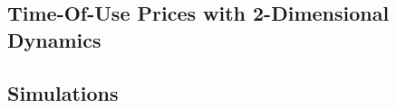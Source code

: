 \subsection{Time-Of-Use Prices with 2-Dimensional Dynamics}
\label{Subsection:Time-Of-Use-Prices-with-2-Dimensional-Dynamics}



\subsection{Simulations}
\label{Subsection:Simulations}


